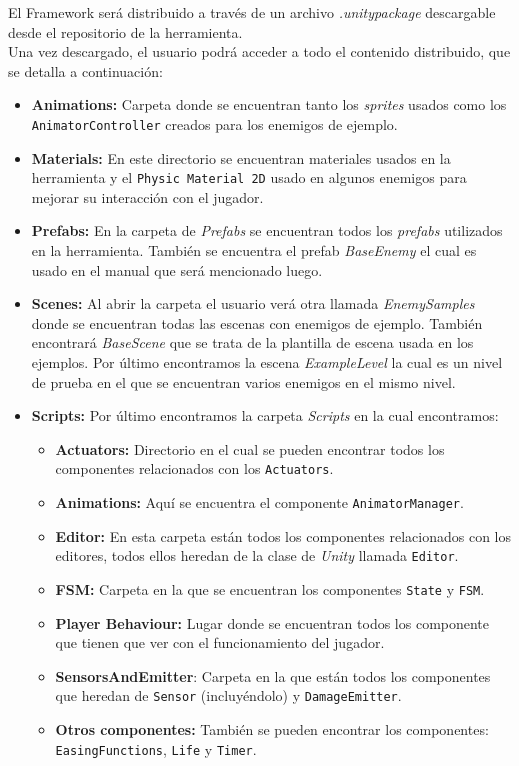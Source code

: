 El Framework será distribuido a través de un archivo \textit{.unitypackage} descargable desde el repositorio de la herramienta.\\

Una vez descargado, el usuario podrá acceder a todo el contenido distribuido, que se detalla a continuación:\\
\begin{itemize}
\item \textbf{Animations:} Carpeta donde se encuentran tanto los \textit{sprites} usados como los \texttt{AnimatorController} creados para los enemigos de ejemplo.
\item \textbf{Materials:} En este directorio se encuentran materiales usados en la herramienta y el \texttt{Physic Material 2D} usado en algunos enemigos para mejorar su interacción con el jugador.
\item \textbf{Prefabs:} En la carpeta de \textit{Prefabs} se encuentran todos los \textit{prefabs} utilizados en la herramienta. También se encuentra el prefab \textit{BaseEnemy} el cual es usado en el manual que será mencionado luego.
\item \textbf{Scenes:} Al abrir la carpeta el usuario verá otra llamada \textit{EnemySamples} donde se encuentran todas las escenas con enemigos de ejemplo. También encontrará \textit{BaseScene} que se trata de la plantilla de escena usada en los ejemplos. Por último encontramos la escena \textit{ExampleLevel} la cual es un nivel de prueba en el que se encuentran varios enemigos en el mismo nivel.
\item \textbf{Scripts:} Por último encontramos la carpeta \textit{Scripts} en la cual encontramos:
	\begin{itemize}
	\item \textbf{Actuators:} Directorio en el cual se pueden encontrar todos los componentes relacionados con los \texttt{Actuators}.
	\item \textbf{Animations:} Aquí se encuentra el componente \texttt{AnimatorManager}.
	\item \textbf{Editor:} En esta carpeta están todos los componentes relacionados con los editores, todos ellos heredan de la clase de \textit{Unity} llamada \texttt{Editor}.
	\item \textbf{FSM:} Carpeta en la que se encuentran los componentes \texttt{State} y \texttt{FSM}.
	\item \textbf{Player Behaviour:} Lugar donde se encuentran todos los componente que tienen que ver con el funcionamiento del jugador.
	\item \textbf{SensorsAndEmitter}: Carpeta en la que están todos los componentes que heredan de \texttt{Sensor} (incluyéndolo) y \texttt{DamageEmitter}.
	\item \textbf{Otros componentes:} También se pueden encontrar los componentes: \texttt{EasingFunctions}, \texttt{Life} y \texttt{Timer}.
	\end{itemize}
\end{itemize}

